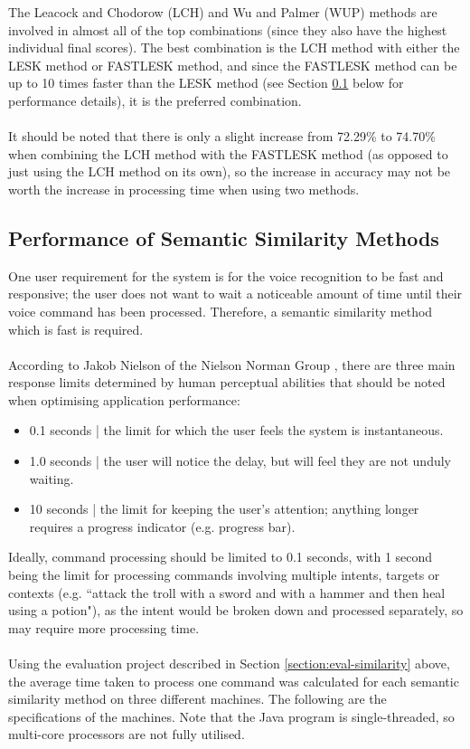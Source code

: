 \documentclass[11pt]{article}
\begin{document}
The Leacock and Chodorow (LCH) and Wu and Palmer (WUP) methods are involved in almost all of the top combinations (since they also have the highest individual final scores). The best combination is the LCH method with either the LESK method or FASTLESK method, and since the FASTLESK method can be up to 10 times faster than the LESK method (see Section \ref{section:performance} below for performance details), it is the preferred combination.
\\
\\
It should be noted that there is only a slight increase from 72.29\% to 74.70\% when combining the LCH method with the FASTLESK method (as opposed to just using the LCH method on its own), so the increase in accuracy may not be worth the increase in processing time when using two methods.

\subsection{Performance of Semantic Similarity Methods}
\label{section:performance}

One user requirement for the system is for the voice recognition to be fast and responsive; the user does not want to wait a noticeable amount of time until their voice command has been processed. Therefore, a semantic similarity method which is fast is required.
\\
\\
According to Jakob Nielson of the Nielson Norman Group \cite{RefWorks:128}, there are three main response limits determined by human perceptual abilities that should be noted when optimising application performance:

\begin{itemize}
\item 0.1 seconds | the limit for which the user feels the system is instantaneous.
\item 1.0 seconds | the user will notice the delay, but will feel they are not unduly waiting.
\item 10 seconds | the limit for keeping the user's attention; anything longer requires a progress indicator (e.g. progress bar).
\end{itemize}

Ideally, command processing should be limited to 0.1 seconds, with 1 second being the limit for processing commands involving multiple intents, targets or contexts (e.g. ``attack the troll with a sword and with a hammer and then heal using a potion"), as the intent would be broken down and processed separately, so may require more processing time.
\\
\\
Using the evaluation project described in Section \ref{section:eval-similarity} above, the average time taken to process one command was calculated for each semantic similarity method on three different machines. The following are the specifications of the machines. Note that the Java program is single-threaded, so multi-core processors are not fully utilised.
\end{document}
